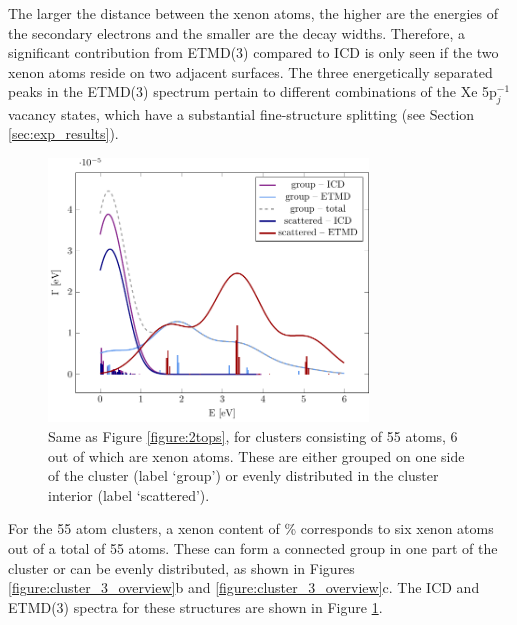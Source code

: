 The larger the distance between the xenon atoms, the higher are the energies
of the secondary electrons and the smaller are the decay widths. 
Therefore, a
significant contribution from ETMD(3) compared to ICD is only
seen if the two xenon atoms reside on two adjacent
surfaces. 
The three energetically separated peaks in the ETMD(3) spectrum pertain to different combinations of the Xe 5p$_j^{-1}$ vacancy states, which have a substantial fine-structure splitting (see Section \ref{sec:exp_results}).
%

\begin{figure}[ht]
 \centering
 \includegraphics[width=8.5cm]{pics/ar_3_6in.pdf}
 \caption{Same as Figure \protect\ref{figure:2tops}, for clusters consisting of
          55 atoms, 6 out of which are xenon atoms. These are either grouped
          on one side of the cluster (label `group') or evenly distributed
          in the cluster interior (label `scattered').}
 \label{figure:ar_3_6in}
\end{figure}
%
For the 55 atom clusters, a xenon content of \unit[10--12]{\%}
corresponds to six xenon atoms out of a total of 55 atoms. These can form a connected 
group in one part of the cluster or can be evenly distributed,
as shown in Figures \ref{figure:cluster_3_overview}b and \ref{figure:cluster_3_overview}c. The
ICD and ETMD(3) spectra for these structures are shown in Figure \ref{figure:ar_3_6in}.

